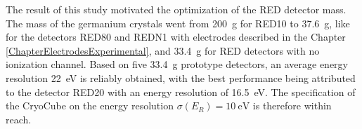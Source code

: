 The result of this study motivated the optimization of the RED detector mass. The mass of the germanium crystals went from \SI{200}{\g} for RED10 to \SI{37.6}{\g}, like for the detectors RED80 and REDN1 with electrodes described in the Chapter \ref{ChapterElectrodesExperimental}, and \SI{33.4}{\g} for RED detectors with no ionization channel. 
Based on five \SI{33.4}{\g} prototype detectors, an average energy resolution \SI{22}{\eV} is reliably obtained, with the best performance being attributed to the detector RED20 \cite{Armengaud:2019kfj} with an energy resolution of \SI{16.5}{\eV}. The specification of the CryoCube on the energy resolution $\sigma(E_R) = \SI{10}{\eV}$ is therefore within reach.

%
